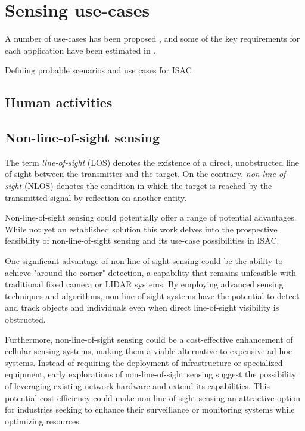 \section{Sensing use-cases}

A number of use-cases has been proposed \cite{Mandelli_Henninger_Bauhofer_Wild_2023}, \cite{Wang_Varshney_Gentile_Blandino_Chuang_Golmie_2022} and some of the  key requirements for each application have been estimated in \cite{Wild_Braun_Viswanathan_2021}.

Defining probable scenarios and use cases for ISAC 


\subsection{Human activities}



\subsection{Non-line-of-sight sensing}

The term \textit{line-of-sight} (LOS)  denotes the existence of a direct, unobstructed line of sight between the transmitter and the target. On the contrary, \textit{non-line-of-sight} (NLOS) denotes the condition in which the target is reached by the transmitted signal by reflection on another entity.

Non-line-of-sight sensing could potentially offer a range of potential advantages. While not yet an established solution this work delves into the prospective feasibility of non-line-of-sight sensing and its use-case possibilities in ISAC.

One significant advantage of non-line-of-sight sensing could be the ability to achieve "around the corner" detection, a capability that remains unfeasible with traditional fixed camera or LIDAR systems. By employing advanced sensing techniques and algorithms, non-line-of-sight systems have the potential to detect and track objects and individuals even when direct line-of-sight visibility is obstructed.

Furthermore, non-line-of-sight sensing could be a cost-effective enhancement of cellular sensing systems, making them a viable alternative to expensive ad hoc systems. Instead of requiring the deployment of infrastructure or specialized equipment, early explorations of non-line-of-sight sensing suggest the possibility of leveraging existing network hardware and extend its capabilities. This potential cost efficiency could make non-line-of-sight sensing an attractive option for industries seeking to enhance their surveillance or monitoring systems while optimizing resources.


